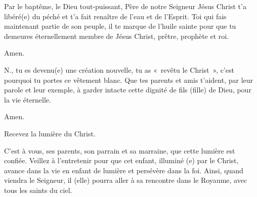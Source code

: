 
Par le baptême, le Dieu tout-puissant, Père de notre Seigneur Jésus Christ
t'a libéré(e) du péché et t'a fait renaître de l'eau et de l'Esprit.
Toi qui fais maintenant partie de son peuple, il te marque de l'huile
sainte pour que tu demeures éternellement membre de Jésus Christ,
prêtre, prophète et roi.

 Amen.


\pars{}

 {\color{red}N.}, tu es devenu(e) une création
nouvelle, tu as «~revêtu le Christ~», c'est pourquoi tu portes ce
vêtement blanc. Que tes parents et amis t'aident, par leur parole
et leur exemple, à garder intacte cette dignité de fils (fille)
de Dieu, pour la vie éternelle.

 Amen.


\pars{}

Recevez la lumière du Christ.


 C'est à vous, ses parents, son parrain et
sa marraine, que cette lumière est confiée. Veillez à l'entretenir pour que
cet enfant, illuminé (e) par le Christ, avance dans la vie en enfant de
lumière et persévère dans la foi. Ainsi, quand viendra le Seigneur, il
(elle) pourra aller à sa rencontre dans le Royaume, avec tous les saints
du ciel.
